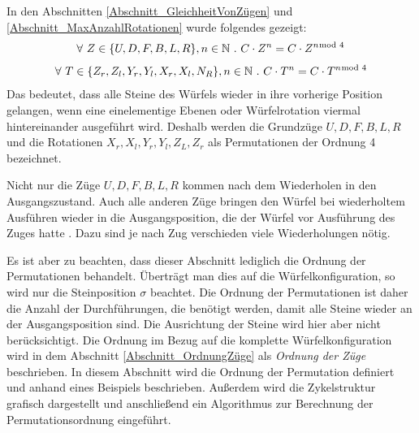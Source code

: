 \documentclass[12pt,a4paper, usenames, dvipsnames]{article}
\theoremstyle{mystyle}
\theoremstyle{definition}
\begin{document}
In den Abschnitten \ref{Abschnitt_GleichheitVonZügen} und \ref{Abschnitt_MaxAnzahlRotationen} wurde folgendes gezeigt:
\begin{align*}
\forall \ Z \in \{ U, D, F, B, L, R \}, n \in \mathbb{N} \ . \ C \cdot Z^n=C \cdot Z^{n \hspace*{-0.5em} \mod 4} 
\end{align*}
\vspace*{-3em}
\begin{align*}
\forall \ T \in \{{Z_r}, {Z_l}, {Y_r}, {Y_l}, {X_r}, {X_l}, N_R \}, n \in \mathbb{N} \ . \ C \cdot T^n=C \cdot T^{n \hspace*{-0.5em} \mod 4}
\end{align*}
Das bedeutet, dass alle Steine des Würfels wieder in ihre vorherige Position gelangen, wenn eine einelementige Ebenen oder Würfelrotation viermal hintereinander ausgeführt wird. Deshalb werden die Grundzüge $U, D, F, B, L, R$ und die Rotationen $X_r, X_l, Y_r, Y_l, Z_L, Z_r$ als Permutationen der Ordnung 4 bezeichnet. 


Nicht nur die Züge $U, D, F, B, L, R$ kommen nach dem Wiederholen in den Ausgangszustand. Auch alle anderen Züge bringen den Würfel bei wiederholtem Ausführen wieder in die Ausgangsposition, die der Würfel vor Ausführung des Zuges hatte \cite{TD}. Dazu sind je nach Zug verschieden viele Wiederholungen nötig. 


Es ist aber zu beachten, dass dieser Abschnitt lediglich die Ordnung der Permutationen behandelt. Überträgt man dies auf die Würfelkonfiguration, so wird nur die Steinposition $\sigma$ beachtet. Die Ordnung der Permutationen ist daher die Anzahl der Durchführungen, die benötigt werden, damit alle Steine wieder an der Ausgangsposition sind. Die Ausrichtung der Steine wird hier aber nicht berücksichtigt. Die Ordnung im Bezug auf die komplette Würfelkonfiguration wird in dem Abschnitt \ref{Abschnitt_OrdnungZüge} als \textit{Ordnung der Züge} beschrieben. In diesem Abschnitt wird die Ordnung der Permutation definiert und anhand eines Beispiels beschrieben. Außerdem wird die Zykelstruktur grafisch dargestellt und anschließend ein Algorithmus zur Berechnung der Permutationsordnung eingeführt.


\end{document}
